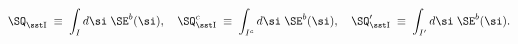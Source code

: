 \begin{equation}
\SQ_{\rm\sst I}^{}\;\equiv\;\int_I d\si\;\SE^b(\si),\quad
\SQ_{\rm\sst I}^c{}\;\equiv\;\int_{I^c}d\si\;\SE^b(\si),\quad
\SQ_{\rm\sst I}'{}\;\equiv\;\int_{I'}d\si\;\SE^b(\si).
\end{equation}

